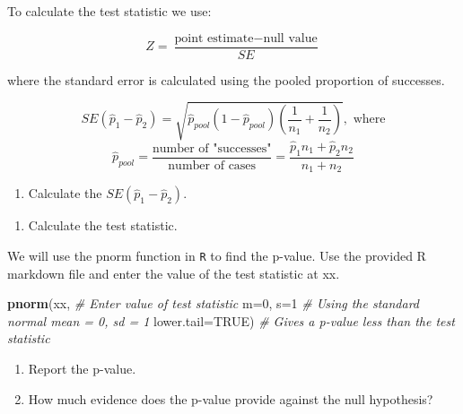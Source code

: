 \documentclass[
]{report}
\newenvironment{Shaded}{\begin{snugshade}}{\end{snugshade}}
\newcommand{\CommentTok}[1]{\textcolor[rgb]{0.56,0.35,0.01}{\textit{#1}}}
\newcommand{\DataTypeTok}[1]{\textcolor[rgb]{0.13,0.29,0.53}{#1}}
\newcommand{\DecValTok}[1]{\textcolor[rgb]{0.00,0.00,0.81}{#1}}
\newcommand{\KeywordTok}[1]{\textcolor[rgb]{0.13,0.29,0.53}{\textbf{#1}}}
\newcommand{\NormalTok}[1]{#1}
\newcommand{\OtherTok}[1]{\textcolor[rgb]{0.56,0.35,0.01}{#1}}
\providecommand{\tightlist}{%
  \setlength{\itemsep}{0pt}\setlength{\parskip}{0pt}}
\begin{document}
\vspace{1in}

To calculate the test statistic we use:

\[
Z = \frac{\text{point estimate} - \text{null value}}{SE}
\]

where the standard error is calculated using the pooled proportion of successes.

\[
SE(\hat{p}_1-\hat{p}_2)=\sqrt{\hat{p}_{pool}(1-\hat{p}_{pool})(\frac{1}{n_1}+\frac{1}{n_2})}, \text{  where}
\]
\[
\hat{p}_{pool} = \frac{\text{number of "successes"}}{\text{number of cases}} = \frac{\hat{p}_1 n_1+\hat{p}_2 n_2}{n_1+n_2}
\]

\vspace{.25in}

\begin{enumerate}
\def\labelenumi{\arabic{enumi}.}
\setcounter{enumi}{16}
\tightlist
\item
  Calculate the \(SE(\hat{p}_1-\hat{p}_2)\).
\end{enumerate}

\vspace{1in}

\begin{enumerate}
\def\labelenumi{\arabic{enumi}.}
\setcounter{enumi}{17}
\tightlist
\item
  Calculate the test statistic.
\end{enumerate}

\vspace{1in}

We will use the pnorm function in \texttt{R} to find the p-value. Use the provided R markdown file and enter the value of the test statistic at xx.

\begin{Shaded}
\begin{Highlighting}[]
\KeywordTok{pnorm}\NormalTok{(xx, }\CommentTok{\# Enter value of test statistic}
      \DataTypeTok{m=}\DecValTok{0}\NormalTok{, }\DataTypeTok{s=}\DecValTok{1} \CommentTok{\# Using the standard normal mean = 0, sd = 1}
      \DataTypeTok{lower.tail=}\OtherTok{TRUE}\NormalTok{) }\CommentTok{\# Gives a p{-}value less than the test statistic}
\end{Highlighting}
\end{Shaded}

\begin{enumerate}
\def\labelenumi{\arabic{enumi}.}
\setcounter{enumi}{18}
\item
  Report the p-value.
  \vspace{0.2in}
\item
  How much evidence does the p-value provide against the null hypothesis?
\end{enumerate}
\end{document}
